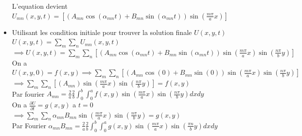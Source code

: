 \documentclass[12pt]{book}
\begin{document}
\begin{itemize}
                    \begin{center}
                    \end{center}
                    L'equation devient $U_{mn}(x,y,t) = \left[ (A_{mn}\cos(\alpha_{mn}t)+B_{mn}\sin(\alpha_{mn}t))\sin(\frac{m\pi}{a}x) \right]$
                \item Utilisant les condition initiale pour trouver la solution finale $U(x,y,t)$ \\
                    $U(x,y,t) = \sum_m\sum_nU_{mn}(x,y,t)$ \\
                    $ \implies U(x,y,t) = \sum_m\sum_n\left[ (A_{mn}\cos(\alpha_{mn}t)+B_{mn}\sin(\alpha_{mn}t))\sin(\frac{m\pi}{a}x)\sin(\frac{n\pi}{b}y) \right]$ \\
                    On a $ U(x,y,0)=f(x,y) \implies \sum_m\sum_n\left[ (A_{mn}\cos(0)+B_{mn}\sin(0))\sin(\frac{m\pi}{a}x)\sin(\frac{n\pi}{b}y)  \right] $ \\
                    $\implies \sum_m\sum_n\left[( A_{mn})\sin(\frac{m\pi}{a}x)\sin(\frac{n\pi}{b}y)  \right] =f(x,y)$ \\
                    Par fourier $A_{mn}=\frac{2}{a}\frac{2}{b}\int^b_0\int^a_0f(x,y)\sin(\frac{m\pi}{a}x)\sin(\frac{n\pi}{b}y)dxdy$ \\
                    On a $\frac{\partial U}{\partial t} = g(x,y)$ a $t =0 $ $\implies \sum_m\sum_n\alpha_{mn}B_{mn}\sin(\frac{m\pi}{a}x)\sin(\frac{n\pi}{b}y) = g(x,y)$\\
                    Par Fourier $ \alpha_{mn}B_{mn} = \frac{2}{a}\frac{2}{b}\int^b_0\int^a_0g(x,y)\sin(\frac{m\pi}{a}x)\sin(\frac{\pi n}{b}y)dxdy $




                    
            \end{itemize}


            
            

            



            
            
            



        
            
\end{document}
